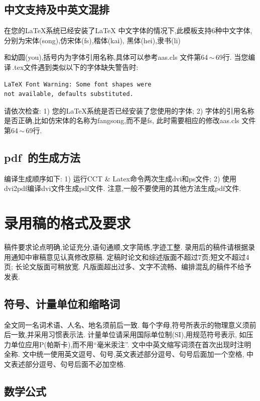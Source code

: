 \documentclass{Style/aas}
\begin{document}
\subsection{中文支持及中英文混排}
在您的\LaTeX 系统已经安装了\LaTeX
中文字体的情况下,此模板支持6种中文字体,分别为宋体(song),仿宋体(fs),楷体(kai),
黑体(hei),隶书(li)
\onecolumn\begin{multicols}{2}%

\noindent 和幼圆(you),括号内为字体引用名称,具体可以参考aas.cls
文件第64\,$\sim$\,69行. 当您编译\,.tex文件遇到类似以下的字体缺失警告时:
\begin{verbatim}
LaTeX Font Warning: Some font shapes were
not available, defaults substituted.
\end{verbatim}
请依次检查: 1) 您的\LaTeX 系统是否已经安装了您使用的字体; 2)
字体的引用名称是否正确,比如仿宋体的名称为fangsong,而不是fs,
此时需要相应的修改aas.cls 文件第64\,$\sim$\,69行.


\subsection{{\bf pdf}~的生成方法}

编译生成顺序如下: 1) 运行CCT \&
Latex命令两次生成dvi和ps文件; 2) 使用dvi2pdf编译dvi文件生成pdf文件.
注意,一般不要使用的其他方法生成pdf文件.

\section{录用稿的格式及要求}

稿件要求论点明确,论证充分,语句通顺,文字简练,字迹工整.
录用后的稿件请根据录用通知中审稿意见认真修改原稿.
定稿时论文和综述版面不超过7页;短文不超过4页; 长论文版面可稍放宽.
凡版面超出过多、文字不流畅、编排混乱的稿件不给予发表.

\subsection{符号、计量单位和缩略词}

全文同一名词术语、人名、地名须前后一致.
每个字母,符号所表示的物理意义须前后一致,并采用习惯表示法.
计量单位请采用国际单位制(SI),用规范符号表示,
如压力单位应用P(帕斯卡),而不用``毫米汞注''.
文中中英文缩写词须在首次出现时注明全称.
文中统一使用英文逗号、句号,英文表述部分逗号、句号后面加一个空格,
中文表述部分逗号、句号后面不必加空格.

\subsection{数学公式}


\end{multicols}
\end{document}
